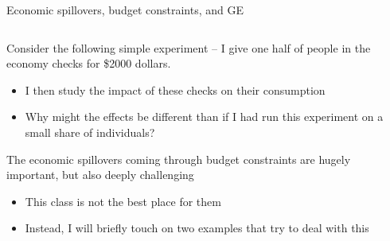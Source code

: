 \documentclass[notes,11pt, aspectratio=169]{beamer}
\newenvironment{wideitemize}{\itemize\addtolength{\itemsep}{10pt}}{\enditemize}
\begin{document}
\begin{frame}{Economic spillovers, budget constraints, and GE}

\begin{columns}[T] %
  \begin{column}{.7\textwidth}
    \begin{wideitemize}
    \item Consider the following simple experiment -- I give one half
      of people in the economy checks for \$2000 dollars.
      \begin{itemize}
      \item I then study the impact of these checks on their consumption
      \item Why might the effects be different than if I had run this
        experiment on a small share of individuals?
      \end{itemize}
    \item The economic spillovers coming through budget constraints
      are hugely important, but also deeply challenging
      \begin{itemize}
      \item This class is not the best place for them
      \item Instead, I will briefly touch on two examples that try to deal with this
      \end{itemize}
    \end{wideitemize}
  \end{column}%
  \hfill%
  \begin{column}{.3\textwidth}
    \begin{center}
    \end{center}
  \end{column}
\end{columns}

\end{frame}
\end{document}
